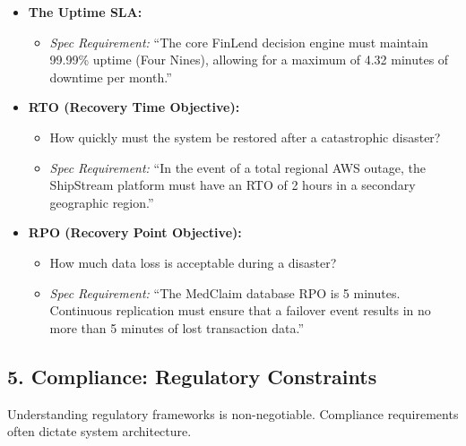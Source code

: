 \documentclass[
  11pt,
  openany,
  oneside]{book}
\providecommand{\tightlist}{%
  \setlength{\itemsep}{0pt}\setlength{\parskip}{0pt}}
\begin{document}
\begin{itemize}
\tightlist
\item
  \textbf{The Uptime SLA:}

  \begin{itemize}
  \tightlist
  \item
    \emph{Spec Requirement:} ``The core FinLend decision engine must
    maintain 99.99\% uptime (Four Nines), allowing for a maximum of 4.32
    minutes of downtime per month.''
  \end{itemize}
\item
  \textbf{RTO (Recovery Time Objective):}

  \begin{itemize}
  \tightlist
  \item
    How quickly must the system be restored after a catastrophic
    disaster?
  \item
    \emph{Spec Requirement:} ``In the event of a total regional AWS
    outage, the ShipStream platform must have an RTO of 2 hours in a
    secondary geographic region.''
  \end{itemize}
\item
  \textbf{RPO (Recovery Point Objective):}

  \begin{itemize}
  \tightlist
  \item
    How much data loss is acceptable during a disaster?
  \item
    \emph{Spec Requirement:} ``The MedClaim database RPO is 5 minutes.
    Continuous replication must ensure that a failover event results in
    no more than 5 minutes of lost transaction data.''
  \end{itemize}
\end{itemize}

\subsection{5. Compliance: Regulatory
Constraints}\label{compliance-regulatory-constraints}

Understanding regulatory frameworks is non-negotiable. Compliance
requirements often dictate system architecture.
\end{document}
